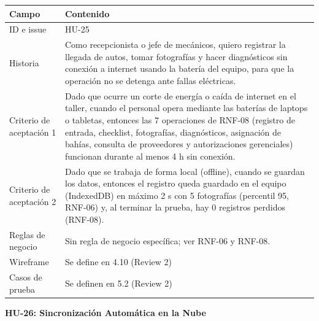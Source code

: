 {\def\LTcaptype{none} %
\begin{longtable}[]{@{}
  >{\raggedright\arraybackslash}p{}
  >{\raggedright\arraybackslash}p{}@{}}
\toprule\noalign{}
\begin{minipage}[b]{\linewidth}\raggedright
\textbf{Campo}
\end{minipage} & \begin{minipage}[b]{\linewidth}\raggedright
\textbf{Contenido}
\end{minipage} \\
\midrule\noalign{}
\endhead
\bottomrule\noalign{}
\endlastfoot
ID e issue & HU-25 \\
Historia & Como recepcionista o jefe de mecánicos, quiero registrar la
llegada de autos, tomar fotografías y hacer diagnósticos sin conexión a
internet usando la batería del equipo, para que la operación no se
detenga ante fallas eléctricas. \\
Criterio de aceptación 1 & Dado que ocurre un corte de energía o caída
de internet en el taller, cuando el personal opera mediante las baterías
de laptops o tabletas, entonces las 7 operaciones de RNF-08 (registro
de entrada, checklist, fotografías, diagnósticos, asignación de bahías,
consulta de proveedores y autorizaciones gerenciales) funcionan durante
al menos 4 h sin conexión. \\
Criterio de aceptación 2 & Dado que se trabaja de forma local (offline),
cuando se guardan los datos, entonces el registro queda guardado en el
equipo (IndexedDB) en máximo 2 s con 5 fotografías (percentil 95,
RNF-06) y, al terminar la prueba, hay 0 registros perdidos
(RNF-08). \\
Reglas de negocio & Sin regla de negocio específica; ver RNF-06 y
RNF-08. \\
Wireframe & Se define en 4.10 (Review 2) \\
Casos de prueba & Se definen en 5.2 (Review 2) \\
\end{longtable}
}

\textbf{HU-26: Sincronización Automática en la Nube}

